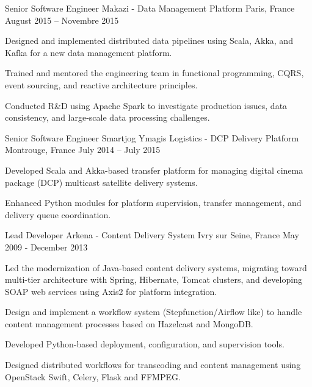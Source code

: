\begin{cventries}
  \cventry
    {Senior Software Engineer} %
    {Makazi - Data Management Platform} %
    {Paris, France} %
    {August 2015 – Novembre 2015} %
    {
      \begin{cvitems} %
        \item {Designed and implemented distributed data pipelines using Scala, Akka, and Kafka for a new data management platform.}
        \item {Trained and mentored the engineering team in functional programming, CQRS, event sourcing, and reactive architecture principles.}
        \item {Conducted R\&D using Apache Spark to investigate production issues, data consistency, and large-scale data processing challenges.}
      \end{cvitems}
    }

  \cventry
    {Senior Software Engineer} %
    {Smartjog Ymagis Logistics - DCP Delivery Platform} %
    {Montrouge, France} %
    {July 2014 – July 2015} %
    {
      \begin{cvitems} %
        \item {Developed Scala and Akka-based transfer platform for managing digital cinema package (DCP) multicast satellite delivery systems.}
        \item {Enhanced Python modules for platform supervision, transfer management, and delivery queue coordination.}
      \end{cvitems}
    }

  \cventry
    {Lead Developer} %
    {Arkena - Content Delivery System} %
    {Ivry sur Seine, France} %
    {May 2009 - December 2013} %
    {
      \begin{cvitems} %
        \item {Led the modernization of Java-based content delivery systems, migrating toward multi-tier architecture with Spring, Hibernate, Tomcat clusters, and developing SOAP web services using Axis2 for platform integration.}
        \item {Design and implement a workflow system (Stepfunction/Airflow like) to handle content management processes based on Hazelcast and MongoDB.}
        \item {Developed Python-based deployment, configuration, and supervision tools.}
        \item {Designed distributed workflows for transcoding and content management using OpenStack Swift, Celery, Flask and FFMPEG.}
      \end{cvitems}
    }

\end{cventries}
